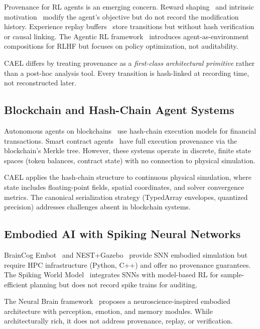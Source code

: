 \documentclass[sigconf,nonacm]{acmart}
\begin{document}
Provenance for RL agents is an emerging concern. Reward
shaping~\cite{ng1999reward} and intrinsic motivation~\cite{bellemare2016}
modify the agent's objective but do not record the modification history.
Experience replay buffers~\cite{schaul2016per} store transitions but
without hash verification or causal linking. The Agentic RL
framework~\cite{agenticrl2026} introduces agent-as-environment
compositions for RLHF but focuses on policy optimization, not
auditability.

CAEL differs by treating provenance as a \emph{first-class architectural
primitive} rather than a post-hoc analysis tool. Every transition is
hash-linked at recording time, not reconstructed later.

\subsection{Blockchain and Hash-Chain Agent Systems}

Autonomous agents on blockchains~\cite{blockchain-agents2025} use
hash-chain execution models for financial transactions. Smart contract
agents~\cite{buterin2014ethereum} have full execution provenance via
the blockchain's Merkle tree. However, these systems operate in
discrete, finite state spaces (token balances, contract state) with
no connection to physical simulation.

CAEL applies the hash-chain structure to continuous physical
simulation, where state includes floating-point fields, spatial
coordinates, and solver convergence metrics. The canonical
serialization strategy (TypedArray envelopes, quantized precision)
addresses challenges absent in blockchain systems.

\subsection{Embodied AI with Spiking Neural Networks}

BrainCog Embot~\cite{braincog2024} and NEST+Gazebo~\cite{nest2014}
provide SNN embodied simulation but require HPC infrastructure
(Python, C++) and offer no provenance guarantees. The Spiking World
Model~\cite{spiking-world2025} integrates SNNs with model-based RL
for sample-efficient planning but does not record spike trains for
auditing.

The Neural Brain framework~\cite{neuralbrain2025} proposes a
neuroscience-inspired embodied architecture with perception, emotion,
and memory modules. While architecturally rich, it does not address
provenance, replay, or verification.
\end{document}
